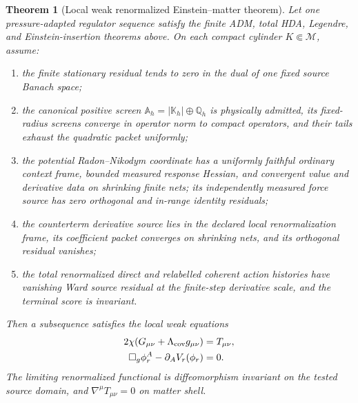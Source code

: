 \documentclass[11pt]{article}
\newtheorem{theorem}{Theorem}[section]
\theoremstyle{definition}
\theoremstyle{remark}
\newcommand{\M}{\mathcal M}
\begin{document}
\begin{theorem}[Local weak renormalized Einstein--matter theorem]
\label{thm:master-local-variation-v036}
Let one pressure-adapted regulator sequence satisfy the finite ADM, total HDA,
Legendre, and Einstein-insertion theorems above.  On each compact cylinder
\(K\Subset\M\), assume:
\begin{enumerate}[label=\textup{(V\arabic*)},leftmargin=3em]
\item the finite stationary residual tends to zero in the dual of one fixed
      source Banach space;
\item the canonical positive screen
      \(\mathbb A_h=|\mathbb K_h|\oplus\mathbb Q_h\) is physically admitted,
      its fixed-radius screens converge in operator norm to compact operators,
      and their tails exhaust the quadratic packet uniformly;
\item the potential Radon--Nikodym coordinate has a uniformly faithful ordinary
      context frame, bounded measured response Hessian, and convergent value and
      derivative data on shrinking finite nets; its independently measured
      force source has zero orthogonal and in-range identity residuals;
\item the counterterm derivative source lies in the declared local
      renormalization frame, its coefficient packet converges on shrinking nets,
      and its orthogonal residual vanishes;
\item the total renormalized direct and relabelled coherent action histories
      have vanishing Ward source residual at the finite-step derivative scale,
      and the terminal score is invariant.
\end{enumerate}
Then a subsequence satisfies the local weak equations
\begin{align}
 2\chi(G_{\mu\nu}+\Lambda_{\rm cov}g_{\mu\nu})
 &=T_{\mu\nu},
 \label{eq:master-local-Einstein}\\
 \Box_g\phi_r^A-\partial_AV_r(\phi_r)&=0.
 \label{eq:master-local-matter}
\end{align}
The limiting renormalized functional is diffeomorphism invariant on the tested
source domain, and \(\nabla^\mu T_{\mu\nu}=0\) on matter shell.
\end{theorem}
\end{document}
